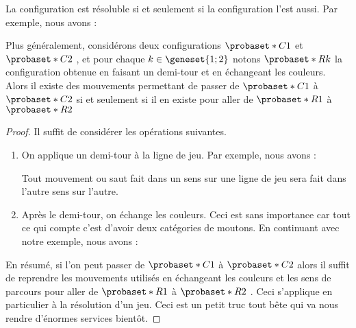 \begin{fact} \label{symmetry}
	La configuration  est résoluble si et seulement si la configuration  l'est aussi. 
	Par exemple, nous avons :
	
	
	\medskip
	
	Plus généralement, considérons deux configurations $\probaset*{C}{1}$ et $\probaset*{C}{2}$ , et pour chaque $k \in \geneset{1 ; 2}$ notons $\probaset*{R}{k}$ la configuration obtenue en faisant un demi-tour et en échangeant les couleurs.
	Alors il existe des mouvements permettant de passer de $\probaset*{C}{1}$ à $\probaset*{C}{2}$ si et seulement si il en existe pour aller de $\probaset*{R}{1}$ à $\probaset*{R}{2}$  
\end{fact}


\begin{proof}
	Il suffit de considérer les opérations suivantes.
	\begin{enumerate}
		\item On applique un demi-tour à la ligne de jeu. 
		      Par exemple, nous avons :
		
		\noindent
		Tout mouvement ou saut fait dans un sens sur une ligne de jeu sera fait dans l'autre sens sur l'autre.

		\item Après le demi-tour, on échange les couleurs. Ceci est sans importance car tout ce qui compte c'est d'avoir deux catégories de moutons. 
		      En continuant avec notre exemple, nous avons :
	\end{enumerate}
	
	En résumé, si l'on peut passer de $\probaset*{C}{1}$ à $\probaset*{C}{2}$ alors il suffit de reprendre les mouvements utilisés en échangeant les couleurs et les sens de parcours pour aller de $\probaset*{R}{1}$ à $\probaset*{R}{2}$ .
	Ceci s'applique en particulier à la résolution d'un jeu. 
	Ceci est un petit truc tout bête qui va nous rendre d'énormes services bientôt.
\end{proof}


